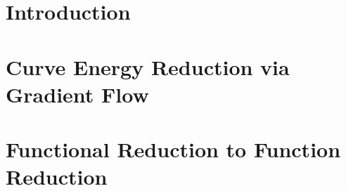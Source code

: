 \documentclass[a4paper, 12pt]{article}
\begin{document}



\tableofcontents

\part{Introduction}


\newpage
\part{Curve Energy Reduction via Gradient Flow}


\newpage
\part{Functional Reduction to Function Reduction}

\printbibliography
\end{document}
